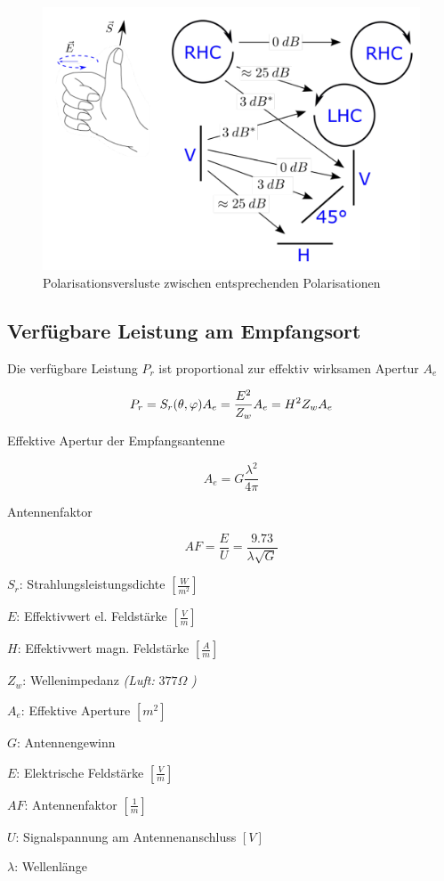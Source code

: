 \documentclass[
  10pt,
  a4paper,
  german]{article}
\numberwithin{equation}{section}
\begin{document}
\begin{figure}[H]

{\centering \includegraphics{images/04_PolarisationsVerluste.png}

}

\caption{Polarisationsversluste zwischen entsprechenden Polarisationen}

\end{figure}

\hypertarget{verfuxfcgbare-leistung-am-empfangsort}{%
\subsection{Verfügbare Leistung am
Empfangsort}\label{verfuxfcgbare-leistung-am-empfangsort}}

\begin{multicols}{2}

Die verfügbare Leistung \(P_r\) ist proportional zur effektiv wirksamen
Apertur \(A_e\)

\[
P_r=S_r(\theta,\varphi)\space A_e=\frac{E^2}{Z_w}A_e=H^2Z_wA_e
\]

Effektive Apertur der Empfangsantenne

\[
A_e=G\frac{\lambda^2}{4\pi}
\]

Antennenfaktor

\[
AF=\frac{E}{U}=\frac{9.73}{\lambda\sqrt{G}}
\]

\columnbreak

\(S_r\): Strahlungsleistungsdichte \(\left[\frac{W}{m^2}\right]\)

\(E\): Effektivwert el. Feldstärke \(\left[\frac{V}{m}\right]\)

\(H\): Effektivwert magn. Feldstärke \(\left[\frac{A}{m}\right]\)

\(Z_w\): Wellenimpedanz \emph{(Luft:} \(377\Omega\) \emph{)}

\(A_e\): Effektive Aperture \([m^2]\)

\(G\): Antennengewinn

\(E\): Elektrische Feldstärke \(\left[\frac{V}{m}\right]\)

\(AF\): Antennenfaktor \(\left[\frac{1}{m}\right]\)

\(U\): Signalspannung am Antennenanschluss \([V]\)

\(\lambda\): Wellenlänge

\end{multicols}
\end{document}
